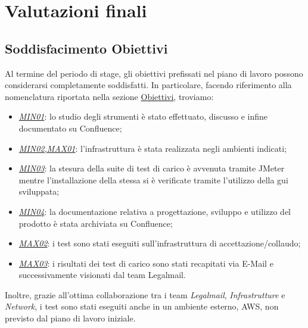 
\chapter{Valutazioni finali}
\label{cap:valutazioni-finali}
\section{Soddisfacimento Obiettivi}
Al termine del periodo di stage, gli obiettivi prefissati nel piano di lavoro possono considerarsi completamente soddisfatti.
In particolare, facendo riferimento alla nomenclatura riportata nella sezione \hyperref[subsec:obiettivi]{Obiettivi}, troviamo:
\begin{itemize}
	\item \underline{\textit{MIN01}}: lo studio degli strumenti è stato effettuato, discusso e infine documentato su Confluence;
	\item \underline{\textit{MIN02,MAX01}}: l'infrastruttura è stata realizzata negli ambienti indicati;
	\item \underline{\textit{MIN03}}: la stesura della suite di test di carico è avvenuta tramite JMeter mentre l'installazione della stessa si è verificate tramite l'utilizzo della \gls{gui} sviluppata;
	\item \underline{\textit{MIN04}}: la documentazione relativa a progettazione, sviluppo e utilizzo del prodotto è stata archiviata su Confluence;
	\item \underline{\textit{MAX02}}: i test sono stati eseguiti sull'infrastruttura di accettazione/collaudo;
	\item \underline{\textit{MAX03}}: i risultati dei test di carico sono stati recapitati via E-Mail e successivamente visionati dal team Legalmail.
\end{itemize}
Inoltre, grazie all'ottima collaborazione tra i team \textit{Legalmail}, \textit{Infrastrutture} e \textit{Network}, i test sono stati eseguiti anche in un ambiente esterno, AWS, non previsto dal piano di lavoro iniziale.
